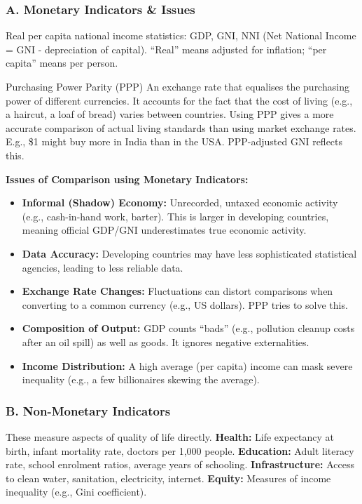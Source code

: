 \documentclass[11pt, a4paper, twoside]{book}
\begin{document}
\subsubsection{A. Monetary Indicators \& Issues}

Real per capita national income statistics: GDP, GNI, NNI (Net National Income = GNI - depreciation of capital). ``Real'' means adjusted for inflation; ``per capita'' means per person.

\begin{keyterm}{Purchasing Power Parity (PPP)}
An exchange rate that equalises the purchasing power of different currencies. It accounts for the fact that the cost of living (e.g., a haircut, a loaf of bread) varies between countries. Using PPP gives a more accurate comparison of actual living standards than using market exchange rates. E.g., \$1 might buy more in India than in the USA. PPP-adjusted GNI reflects this.
\end{keyterm}

\textbf{Issues of Comparison using Monetary Indicators:}
\begin{itemize}
  \item \textbf{Informal (Shadow) Economy:} Unrecorded, untaxed economic activity (e.g., cash-in-hand work, barter). This is larger in developing countries, meaning official GDP/GNI underestimates true economic activity.
  \item \textbf{Data Accuracy:} Developing countries may have less sophisticated statistical agencies, leading to less reliable data.
  \item \textbf{Exchange Rate Changes:} Fluctuations can distort comparisons when converting to a common currency (e.g., US dollars). PPP tries to solve this.
  \item \textbf{Composition of Output:} GDP counts ``bads'' (e.g., pollution cleanup costs after an oil spill) as well as goods. It ignores negative externalities.
  \item \textbf{Income Distribution:} A high average (per capita) income can mask severe inequality (e.g., a few billionaires skewing the average).
\end{itemize}

\subsubsection{B. Non-Monetary Indicators}

These measure aspects of quality of life directly. \textbf{Health:} Life expectancy at birth, infant mortality rate, doctors per 1,000 people. \textbf{Education:} Adult literacy rate, school enrolment ratios, average years of schooling. \textbf{Infrastructure:} Access to clean water, sanitation, electricity, internet. \textbf{Equity:} Measures of income inequality (e.g., Gini coefficient).
\end{document}
